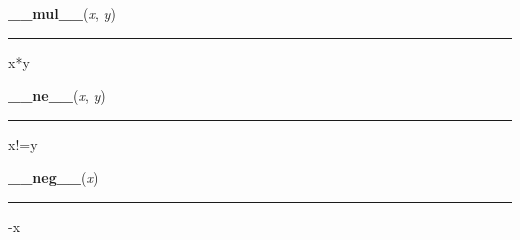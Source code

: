     \vspace{0.5ex}

    \begin{boxedminipage}{\textwidth}

    \raggedright \textbf{\_\_mul\_\_}(\textit{x}, \textit{y})

    \vspace{-1.5ex}

    \rule{\textwidth}{0.5\fboxrule}

x*y
    \vspace{1ex}

    \end{boxedminipage}

    \label{numpy:ndarray:__ne__}

    \vspace{0.5ex}

    \begin{boxedminipage}{\textwidth}

    \raggedright \textbf{\_\_ne\_\_}(\textit{x}, \textit{y})

    \vspace{-1.5ex}

    \rule{\textwidth}{0.5\fboxrule}

x!=y
    \vspace{1ex}

    \end{boxedminipage}

    \label{numpy:ndarray:__neg__}

    \vspace{0.5ex}

    \begin{boxedminipage}{\textwidth}

    \raggedright \textbf{\_\_neg\_\_}(\textit{x})

    \vspace{-1.5ex}

    \rule{\textwidth}{0.5\fboxrule}

-x
    \vspace{1ex}

    \end{boxedminipage}

    \label{numpy:ndarray:__nonzero__}

    \vspace{0.5ex}

